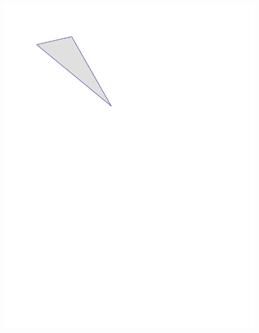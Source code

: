 \begin{prob}
\begin{fullwidth}
\includegraphics{../graphics/triangle.pdf}
\end{fullwidth}

\end{prob}
